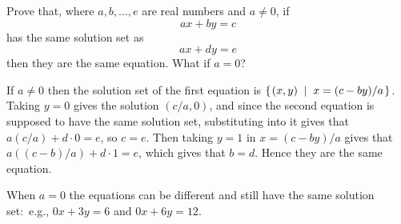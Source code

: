 \index{}


\begin{Exercise}[
name={},
title={}, 
difficulty=0,
origin={\cite{JH}}]
Prove that, where \( a,b,\ldots,e \) are real numbers
and \( a\neq 0 \), if
\begin{equation*}
ax+by=c
\end{equation*}
has the same solution set as
\begin{equation*}
ax+dy=e
\end{equation*}
then they are the same equation.
What if \( a=0 \)?
\end{Exercise}

\begin{Answer}
If \( a\neq 0 \) then the solution set of the first equation is
\( \mbox{$\left\{\hspace{0.1em}(x,y)\;\;\middle|\;\; x=(c-by)/a\hspace{0.1em}\right\}$} \).
Taking $y=0$ gives the solution $(c/a,0)$, and since the second
equation is supposed to have the same solution set, substituting into
it gives that $a(c/a)+d\cdot 0=e$, so $c=e$.
Then taking $y=1$ in $x=(c-by)/a$ gives that $a((c-b)/a)+d\cdot 1=e$,
which gives that $b=d$.
Hence they are the same equation.

When \( a=0 \) the equations can be different and still have the 
same solution set:~e.g.,
\( 0x+3y=6 \) and \( 0x+6y=12 \).   
\end{Answer}
